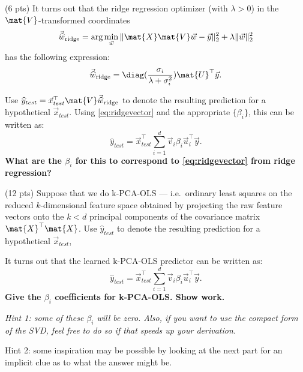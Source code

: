 \documentclass[preview]{standalone}
\begin{document}
\begin{Parts}


\Part (6 pts) It turns out that the ridge regression optimizer (with $\lambda
> 0$) in the $\mat{V}$-transformed coordinates
    \begin{equation*}
    \hatwridge = \arg \min_{\vec{w}} \| \mat{X} \mat{V} \vec{w} - \vec{y}\|_2^2 + \lambda \| \vec{w}\|_2^2
    \end{equation*}
    has the following expression:
    \begin{equation} \label{eq:ridgevector}
      \hatwridge = \diag(\frac{\sigma_i}{\lambda + \sigma_i^2}) \mat{U}^\top \vec{y}.
    \end{equation}
        
    Use $\widehat{y}_{test} = \vec{x}_{test}^{\top} \mat{V} \hatwridge$ to denote the resulting prediction for a
    hypothetical $\vec{x}_{test}$. Using \eqref{eq:ridgevector} and
    the appropriate $\{\beta_i\}$, this can be written as:
\begin{equation}
\label{eq:pred}
\widehat{y}_{test} = \vec{x}_{test}^\top \sum_{i=1}^d \vec{v}_i \beta_i \vec{u}_i^\top \vec{y}.
\end{equation}
{\bf What are the $\beta_i$ for this to correspond to \eqref{eq:ridgevector} from ridge regression?}


\newpage

\Part (12 pts) Suppose that we do k-PCA-OLS --- i.e.~ordinary least
squares on the reduced $k$-dimensional feature space obtained by
projecting the raw feature vectors onto the $k < d$ principal components
of the covariance matrix $\mat{X}^\top \mat{X}$. Use $\widehat{y}_{test}$ to
denote the resulting prediction for a hypothetical $\vec{x}_{test}$,

It turns out that the learned k-PCA-OLS predictor can be written as:
\begin{equation}
\label{eq:pred}
\widehat{y}_{test} = \vec{x}_{test}^\top \sum_{i=1}^d \vec{v}_i \beta_i \vec{u}_i^\top \vec{y}.
\end{equation}
{\bf Give the $\beta_i$ coefficients for k-PCA-OLS. Show work.}

{\em Hint 1: some of these $\beta_i$ will be zero. Also, if you want to
  use the compact form of the SVD, feel free to do so if that speeds
  up your derivation.

Hint 2: some inspiration may be possible by looking at the next part
for an implicit clue as to what the answer might be.
}









\end{Parts}
\end{document}
